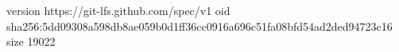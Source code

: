 version https://git-lfs.github.com/spec/v1
oid sha256:5dd09308a598db8ae059b0d1ff36cc0916a696c51fa08bfd54ad2ded94723c16
size 19022
